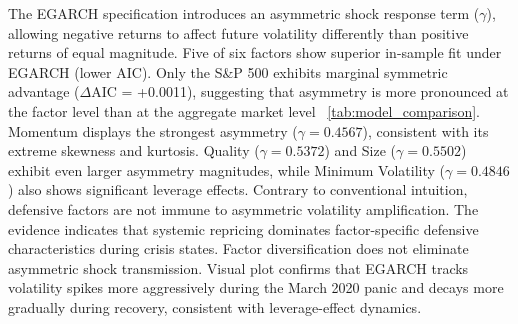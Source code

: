 \documentclass{article}
\begin{document}
The EGARCH specification introduces an asymmetric shock response term ($\gamma$), allowing negative returns to affect future volatility differently than positive returns of equal magnitude. Five of six factors show superior in-sample fit under EGARCH (lower AIC). Only the S\&P 500 exhibits marginal symmetric advantage ($\Delta$AIC = +0.0011), suggesting that asymmetry is more pronounced at the factor level than at the aggregate market level ~\ref{tab:model_comparison}. Momentum displays the strongest asymmetry ($\gamma = 0.4567$), consistent with its extreme skewness and kurtosis. Quality ($\gamma = 0.5372$) and Size ($\gamma = 0.5502$) exhibit even larger asymmetry magnitudes, while Minimum Volatility ($\gamma = 0.4846$) also shows significant leverage effects. Contrary to conventional intuition, defensive factors are not immune to asymmetric volatility amplification. The evidence indicates that systemic repricing dominates factor-specific defensive characteristics during crisis states. Factor diversification does not eliminate asymmetric shock transmission. Visual plot confirms that EGARCH tracks volatility spikes more aggressively during the March 2020 panic and decays more gradually during recovery, consistent with leverage-effect dynamics.\newline
\end{document}
